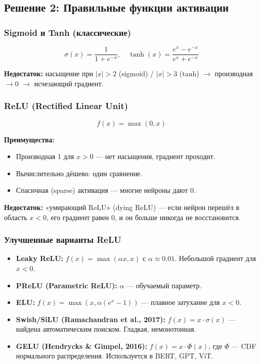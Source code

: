 \documentclass[a4paper,12pt]{article}
\begin{document}
\subsection{Решение 2: Правильные функции активации}

\subsubsection{Sigmoid и Tanh (классические)}
\[
\sigma(x) = \frac{1}{1+e^{-x}}, \quad \tanh(x) = \frac{e^x - e^{-x}}{e^x + e^{-x}}
\]

\textbf{Недостаток:} насыщение при $|x| > 2$ (sigmoid) / $|x| > 3$ (tanh) $\to$ производная $\to 0$ $\to$ исчезающий градиент.

\subsubsection{ReLU (Rectified Linear Unit)}
\[
f(x) = \max(0, x)
\]

\textbf{Преимущества:}
\begin{itemize}
    \item Производная 1 для $x > 0$ — нет насыщения, градиент проходит.
    \item Вычислительно дёшево: один сравнение.
    \item Спасичная (sparse) активация — многие нейроны дают 0.
\end{itemize}

\textbf{Недостаток:} «умирающий ReLU» (dying ReLU) — если нейрон перешёл в область $x < 0$, его градиент равен 0, и он больше никогда не восстановится.

\subsubsection{Улучшенные варианты ReLU}
\begin{itemize}
    \item \textbf{Leaky ReLU:} $f(x) = \max(\alpha x, x)$ с $\alpha \approx 0.01$. Небольшой градиент для $x < 0$.
    \item \textbf{PReLU (Parametric ReLU):} $\alpha$ — обучаемый параметр.
    \item \textbf{ELU:} $f(x) = \max(x, \alpha(e^x - 1))$ — плавное затухание для $x < 0$.
    \item \textbf{Swish/SiLU (Ramachandran et al., 2017):} $f(x) = x \cdot \sigma(x)$ — найдена автоматическим поиском. Гладкая, немонотонная.
    \item \textbf{GELU (Hendrycks \& Gimpel, 2016):} $f(x) = x \cdot \Phi(x)$, где $\Phi$ — CDF нормального распределения. Используется в BERT, GPT, ViT.
\end{itemize}
\end{document}
